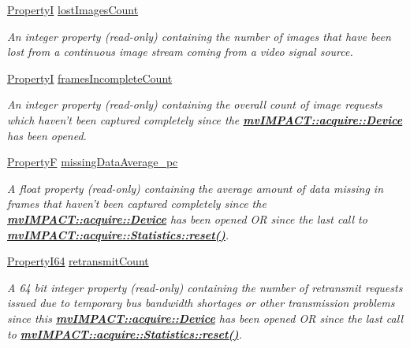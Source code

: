\begin{DoxyCompactItemize}
\hyperlink{group___common_interface_ga12d5e434238ca242a1ba4c6c3ea45780}{Property\+I} \hyperlink{classmv_i_m_p_a_c_t_1_1acquire_1_1_statistics_abde1d07aa81d81e9c9a9825a2674fbcd}{lost\+Images\+Count}
\begin{DoxyCompactList}\small\item\em An integer property {\bfseries }(read-\/only) containing the number of images that have been lost from a continuous image stream coming from a video signal source. \end{DoxyCompactList}\item 
\hyperlink{group___common_interface_ga12d5e434238ca242a1ba4c6c3ea45780}{Property\+I} \hyperlink{classmv_i_m_p_a_c_t_1_1acquire_1_1_statistics_abf27ea8fea8cad9b47b621ecab4e39d9}{frames\+Incomplete\+Count}
\begin{DoxyCompactList}\small\item\em An integer property {\bfseries }(read-\/only) containing the overall count of image requests which haven't been captured completely since the {\bfseries \hyperlink{classmv_i_m_p_a_c_t_1_1acquire_1_1_device}{mv\+I\+M\+P\+A\+C\+T\+::acquire\+::\+Device}} has been opened. \end{DoxyCompactList}\item 
\hyperlink{group___common_interface_gaf54865fe5a3d5cfd15f9a111b40d09f9}{Property\+F} \hyperlink{classmv_i_m_p_a_c_t_1_1acquire_1_1_statistics_adb07566662f23c71c69465bab7b149e4}{missing\+Data\+Average\+\_\+pc}
\begin{DoxyCompactList}\small\item\em A float property {\bfseries }(read-\/only) containing the average amount of data missing in frames that haven't been captured completely since the {\bfseries \hyperlink{classmv_i_m_p_a_c_t_1_1acquire_1_1_device}{mv\+I\+M\+P\+A\+C\+T\+::acquire\+::\+Device}} has been opened O\+R since the last call to {\bfseries \hyperlink{classmv_i_m_p_a_c_t_1_1acquire_1_1_statistics_adc21a9add6973f8f829f751e616b0a43}{mv\+I\+M\+P\+A\+C\+T\+::acquire\+::\+Statistics\+::reset()}}. \end{DoxyCompactList}\item 
\hyperlink{group___common_interface_ga81749b2696755513663492664a18a893}{Property\+I64} \hyperlink{classmv_i_m_p_a_c_t_1_1acquire_1_1_statistics_a2671816bdd4ada13dae8930029510be1}{retransmit\+Count}
\begin{DoxyCompactList}\small\item\em A 64 bit integer property {\bfseries }(read-\/only) containing the number of retransmit requests issued due to temporary bus bandwidth shortages or other transmission problems since this {\bfseries \hyperlink{classmv_i_m_p_a_c_t_1_1acquire_1_1_device}{mv\+I\+M\+P\+A\+C\+T\+::acquire\+::\+Device}} has been opened O\+R since the last call to {\bfseries \hyperlink{classmv_i_m_p_a_c_t_1_1acquire_1_1_statistics_adc21a9add6973f8f829f751e616b0a43}{mv\+I\+M\+P\+A\+C\+T\+::acquire\+::\+Statistics\+::reset()}}. \end{DoxyCompactList}\end{DoxyCompactItemize}
